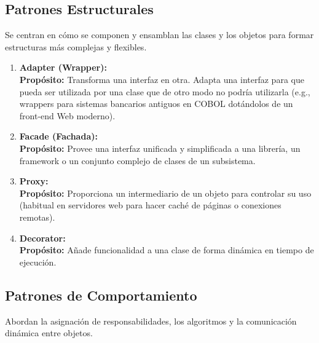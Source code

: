 \subsection{Patrones Estructurales}

Se centran en cómo se componen y ensamblan las clases y los objetos para formar estructuras más complejas y flexibles.

\begin{enumerate}[leftmargin=1.5em]
  \item \textbf{Adapter (Wrapper):}\\
  \textbf{Propósito:} Transforma una interfaz en otra. Adapta una interfaz para que pueda ser utilizada por una clase que de otro modo no podría utilizarla (e.g., wrappers para sistemas bancarios antiguos en COBOL dotándolos de un front-end Web moderno).

  \item \textbf{Facade (Fachada):}\\
  \textbf{Propósito:} Provee una interfaz unificada y simplificada a una librería, un framework o un conjunto complejo de clases de un subsistema.

  \item \textbf{Proxy:}\\
  \textbf{Propósito:} Proporciona un intermediario de un objeto para controlar su uso (habitual en servidores web para hacer caché de páginas o conexiones remotas).

  \item \textbf{Decorator:}\\
  \textbf{Propósito:} Añade funcionalidad a una clase de forma dinámica en tiempo de ejecución.
\end{enumerate}

\subsection{Patrones de Comportamiento}

Abordan la asignación de responsabilidades, los algoritmos y la comunicación dinámica entre objetos.

